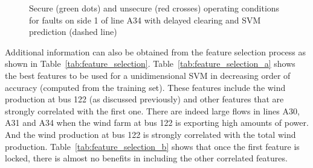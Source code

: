
\begin{figure}
\centering
{}
\caption{Secure (green dots) and unsecure (red crosses) operating conditions for faults on side 1 of line A34 with delayed clearing and SVM prediction (dashed line)}
\label{fig:A34_SVM}
\end{figure}

Additional information can also be obtained from the feature selection process as shown in Table~\ref{tab:feature_selection}. Table~\ref{tab:feature_selection_a} shows the best features to be used for a unidimensional SVM in decreasing order of accuracy (computed from the training set). These features include the wind production at bus 122 (as discussed previously) and other features that are strongly correlated with the first one. There are indeed large flows in lines A30, A31 and A34 when the wind farm at bus 122 is exporting high amounts of power. And the wind production at bus 122 is strongly correlated with the total wind production. Table~\ref{tab:feature_selection_b} shows that once the first feature is locked, there is almost no benefits in including the other correlated features.

